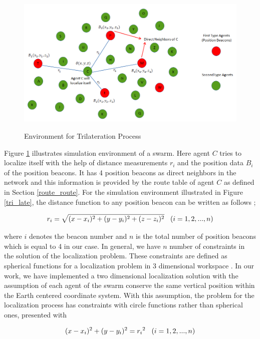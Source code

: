 \begin{figure}[H] 
\caption{Environment for Trilateration Process} \label{tri_late}
\centering
\includegraphics[scale = 0.55]{beacons}
\label{beacons_ref}
\end{figure}

Figure \ref{beacons_ref} illustrates simulation environment of a swarm. Here agent $C$ tries to localize itself with the help of distance measurements $r_i$ and the position data $B_i$ of the position beacons. It has 4 position beacons as direct neighbors in the network and this information is provided by the route table of agent $C$ as defined in Section \ref{route_route}. For the simulation environment illustrated in Figure \ref{tri_late}, the distance function to any position beacon can be written as follows \cite{22};

\begin{equation} %
{r_i} = \sqrt{(x-x_i)^2 + (y-y_i)^2+ (z-z_i)^2}    \hspace{0.3cm}   (i=1,2,...,n)
\end{equation}

where $i$ denotes the beacon number and $n$ is the total number of position beacons which is equal to 4 in our case.  In general, we have $n$ number of constraints in the solution of the localization problem. These constraints are defined as spherical functions for a localization problem in 3 dimensional workspace \cite{22}. In our work, we have implemented a two dimensional localization solution with the assumption of each agent of the swarm conserve the same vertical position within the Earth centered coordinate system. With this assumption, the problem for the localization process has constraints with circle functions rather than spherical ones, presented with

\begin{equation}
(x-x_i)^2 + (y - y_i)^2 = {r_i}^2 \hspace{0.3cm}   (i=1,2,...,n)
\end{equation}


